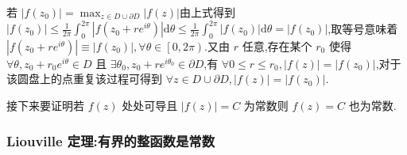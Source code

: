 若 $|f\left( z_0 \right) |=\max_{z\in D\cup \partial D} |f\left( z \right) |$由上式得到 $|f\left( z_0 \right) |\le \frac{1}{2\pi}\int_{0}^{2\pi}|f\left( z_0+re^{i \theta} \right) |\mathrm{d}\theta\le \frac{1}{2\pi }\int_{0}^{2\pi}|f\left( z_0 \right) |\mathrm{d}\theta=|f\left( z_0 \right) |$,取等号意味着 $|f\left( z_0+re^{i \theta} \right) |\equiv |f\left( z_0 \right) |,\forall \theta\in \left[ 0,2\pi  \right)$.又由 $r$ 任意,存在某个 $r_0$ 使得 $\forall \theta,z_0+r_0e^{i \theta}\in D$ 且 $\exists \theta_0,z_0+re^{i \theta_0}\in \partial D$,有 $\forall 0\le r\le r_0,|f\left( z \right) |=|f\left( z_0 \right) |$,对于该圆盘上的点重复该过程可得到 $\forall z\in D\cup \partial D,|f\left( z \right) |=|f\left( z_0 \right) |$.

接下来要证明若 $f\left( z \right) $ 处处可导且 $|f\left( z \right) |=C$ 为常数则 $f\left( z \right) =C$ 也为常数.

\subsubsection{Liouville 定理:有界的整函数是常数}




